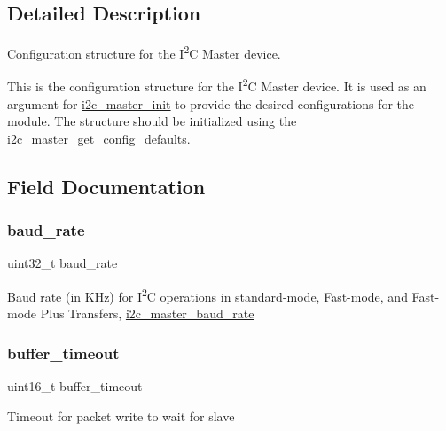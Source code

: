 \subsection{Detailed Description}
Configuration structure for the I\textsuperscript{2}C Master device. 

This is the configuration structure for the I\textsuperscript{2}C Master device. It is used as an argument for \mbox{\hyperlink{group__asfdoc__sam0__sercom__i2c__group_ga1c174d923b525f6d60402f66bc9c3451}{i2c\+\_\+master\+\_\+init}} to provide the desired configurations for the module. The structure should be initialized using the i2c\+\_\+master\+\_\+get\+\_\+config\+\_\+defaults. 

\subsection{Field Documentation}
\mbox{\label{structi2c__master__config_a148f33bbcda8087a77d8ba30f7e3c502}} 
\subsubsection{\texorpdfstring{baud\_rate}{baud\_rate}}
{\footnotesize\ttfamily uint32\+\_\+t baud\+\_\+rate}

Baud rate (in K\+Hz) for I\textsuperscript{2}C operations in standard-\/mode, Fast-\/mode, and Fast-\/mode Plus Transfers, \mbox{\hyperlink{group__asfdoc__sam0__sercom__i2c__group_gace1e0023f2eee92565496a2e30006548}{i2c\+\_\+master\+\_\+baud\+\_\+rate}} \mbox{\label{structi2c__master__config_a749c4f56b937e974dba38373c822eb5e}} 
\subsubsection{\texorpdfstring{buffer\_timeout}{buffer\_timeout}}
{\footnotesize\ttfamily uint16\+\_\+t buffer\+\_\+timeout}

Timeout for packet write to wait for slave \mbox{\label{structi2c__master__config_a2dba667c6d06bff254b7284d45dd02a3}} 
